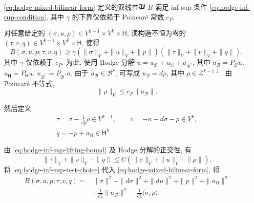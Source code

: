 
\begin{Theorem}\label{thm:hodge-mixed-inf-sup}
{\eqref{eq:hodge-mixed-bilinear-form} 定义的双线性型 $B$ 满足 inf-sup 条件 \eqref{eq:hodge-inf-sup-condition}, 其中 $\gamma$ 的下界仅依赖于 Poincaré 常数 $c_P$.}
\end{Theorem}

\begin{Proof}
{对任意给定的 $(\sigma,u,p)\in V^{k-1}\times V^k\times\mathsf H$, 须构造不恒为零的 $(\tau,v,q)\in V^{k-1}\times V^k\times\mathsf H$, 使得}
\[
B(\sigma,u,p;\tau,v,q)\geq\gamma(\|\sigma\|_V+\|u\|_V+\|p\|)(\|\tau\|_V+\|v\|_V+\|q\|),
\]
{其中 $\gamma$ 仅依赖于 $c_P$. 为此, 使用 Hodge 分解 $u=u_{\mathcal B}+u_{\mathsf H}+u_{\mathcal B^*}$, 其中 $u_{\mathcal B}=P_{\mathcal B}u$, $u_{\mathsf H}=P_{\mathsf H}u$, $u_{\mathcal B^*}=P_{\mathcal B^*}u$. 由于 $u_{\mathcal B}\in\mathcal B^k$, 可写成 $u_{\mathcal B}=d\rho$, 其中 $\rho\in\mathcal Z^{k-1\perp}$. 由 Poincaré 不等式,}
\begin{equation}\label{eq:hodge-inf-sup-lifting-bound}
\|\rho\|_V\leq c_P\|u_{\mathcal B}\|.
\end{equation}

{然后定义}
\begin{equation}\label{eq:hodge-inf-sup-test-choice}
\begin{gathered}
\tau=\sigma-\frac{1}{c_P^2}\rho\in V^{k-1},\qquad v=-u-d\sigma-p\in V^k,\\
q=-p+u_{\mathsf H}\in\mathsf H^k.
\end{gathered}
\end{equation}

{由 \eqref{eq:hodge-inf-sup-lifting-bound} 及 Hodge 分解的正交性, 有}
\begin{equation}\label{eq:hodge-inf-sup-test-bound}
\|\tau\|_V+\|v\|_V+\|q\|\leq C(\|\sigma\|_V+\|u\|_V+\|p\|).
\end{equation}
{将 \eqref{eq:hodge-inf-sup-test-choice} 代入 \eqref{eq:hodge-mixed-bilinear-form}, 得}
\[
\begin{aligned}
B(\sigma,u,p;\tau,v,q)={}&\|\sigma\|^2+\|d\sigma\|^2+\|du\|^2+\|p\|^2+\|u_{\mathsf H}\|^2\\
&+\frac{1}{c_P^2}\|u_{\mathcal B}\|^2-\frac{1}{c_P^2}\langle\sigma,\rho\rangle.
\end{aligned}
\]


\end{Proof}
